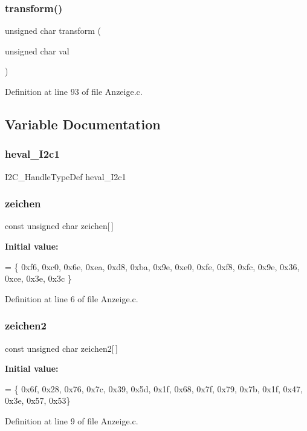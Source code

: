 \subsubsection{transform()}
{\footnotesize\ttfamily unsigned char transform (\begin{DoxyParamCaption}\item[{unsigned char}]{val }\end{DoxyParamCaption})}



Definition at line 93 of file Anzeige.\+c.



\subsection{Variable Documentation}
\mbox{\label{_anzeige_8c_a3c25ceb82d105bd77169a948931e9bce}} 
\subsubsection{heval\+\_\+\+I2c1}
{\footnotesize\ttfamily I2\+C\+\_\+\+Handle\+Type\+Def heval\+\_\+\+I2c1}

\mbox{\label{_anzeige_8c_a50cc955c1515fdaea48f51f75d69c164}} 
\subsubsection{zeichen}
{\footnotesize\ttfamily const unsigned char zeichen[$\,$]}

{\bfseries Initial value\+:}
\begin{DoxyCode}
= \{ 0xf6, 0xc0, 0x6e, 0xea, 0xd8, 0xba, 0x9e, 0xe0, 0xfe, 0xf8, 0xfc, 0x9e,
                                  0x36, 0xce, 0x3e, 0x3c \}
\end{DoxyCode}


Definition at line 6 of file Anzeige.\+c.

\mbox{\label{_anzeige_8c_a560a03324b2c77970b9fa5cff34ec9c1}} 
\subsubsection{zeichen2}
{\footnotesize\ttfamily const unsigned char zeichen2[$\,$]}

{\bfseries Initial value\+:}
\begin{DoxyCode}
= \{ 0x6f, 0x28, 0x76, 0x7c, 0x39, 0x5d, 0x1f, 0x68, 0x7f, 0x79, 0x7b, 0x1f,
                                  0x47, 0x3e, 0x57, 0x53\}
\end{DoxyCode}


Definition at line 9 of file Anzeige.\+c.

